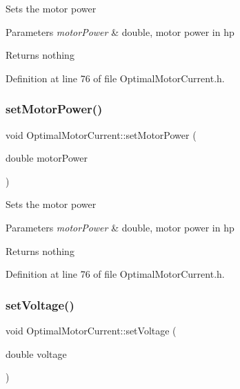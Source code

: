 Sets the motor power


\begin{DoxyParams}{Parameters}
{\em motor\+Power} & double, motor power in hp\\
\hline
\end{DoxyParams}
\begin{DoxyReturn}{Returns}
nothing 
\end{DoxyReturn}


Definition at line 76 of file Optimal\+Motor\+Current.\+h.

\mbox{\label{class_optimal_motor_current_a4950fe2e789f5c150648a846898aff74}} 
\subsubsection{\texorpdfstring{set\+Motor\+Power()}{setMotorPower()}\hspace{0.1cm}{\footnotesize\ttfamily [3/3]}}
{\footnotesize\ttfamily void Optimal\+Motor\+Current\+::set\+Motor\+Power (\begin{DoxyParamCaption}\item[{double}]{motor\+Power }\end{DoxyParamCaption})\hspace{0.3cm}{\ttfamily [inline]}}

Sets the motor power


\begin{DoxyParams}{Parameters}
{\em motor\+Power} & double, motor power in hp\\
\hline
\end{DoxyParams}
\begin{DoxyReturn}{Returns}
nothing 
\end{DoxyReturn}


Definition at line 76 of file Optimal\+Motor\+Current.\+h.

\mbox{\label{class_optimal_motor_current_a71dd261541b67b551e7053d3d6a35f6d}} 
\subsubsection{\texorpdfstring{set\+Voltage()}{setVoltage()}\hspace{0.1cm}{\footnotesize\ttfamily [1/3]}}
{\footnotesize\ttfamily void Optimal\+Motor\+Current\+::set\+Voltage (\begin{DoxyParamCaption}\item[{double}]{voltage }\end{DoxyParamCaption})\hspace{0.3cm}{\ttfamily [inline]}}

